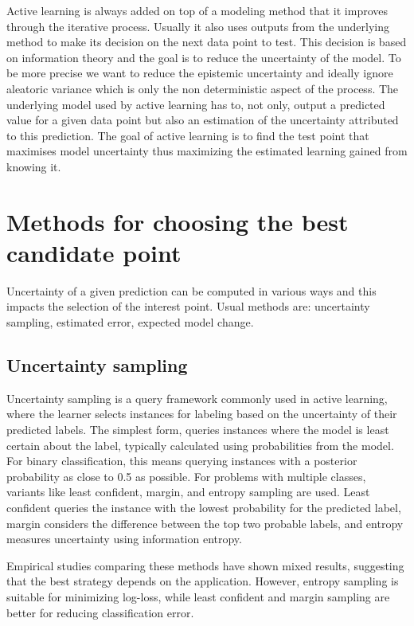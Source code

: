 \documentclass[11pt]{article}
\begin{document}
Active learning is always added on top of a modeling method that it improves through the iterative process. Usually it also uses outputs from the underlying method to make its decision on the next data point to test. This decision is based on information theory and the goal is to reduce the uncertainty of the model. To be more precise we want to reduce the epistemic uncertainty and ideally ignore aleatoric variance which is only the non deterministic aspect of the process. The underlying model used by active learning has to, not only, output a predicted value for a given data point but also an estimation of the uncertainty attributed to this prediction. The goal of active learning
is to find the test point that maximises model uncertainty thus maximizing the estimated learning gained from knowing it.

\section{Methods for choosing the best candidate point}
Uncertainty of a given prediction can be computed in various ways and this impacts the selection of the interest point. Usual methods are: uncertainty sampling, estimated error, expected model change.%

\subsection{Uncertainty sampling}
Uncertainty sampling is a query framework commonly used in active learning, where the learner selects instances for labeling based on the uncertainty of their predicted labels. The simplest form, queries instances where the model is least certain about the label, typically calculated using probabilities from the model\cite{lewis_sequential_1994}.
For binary classification, this means querying instances with a posterior probability as close to 0.5 as possible. For problems with multiple classes, variants like least confident, margin, and entropy sampling are used. Least confident queries the instance with the lowest probability for the predicted label, margin considers the difference between the top two probable labels, and entropy measures uncertainty using information entropy.

Empirical studies comparing these methods have shown mixed results, suggesting that the best strategy depends on the application\cite{hutchison_multi-class_2006}\cite{schein_active_2004}. However, entropy sampling is suitable for minimizing log-loss, while least confident and margin sampling are better for reducing classification error.
\end{document}
